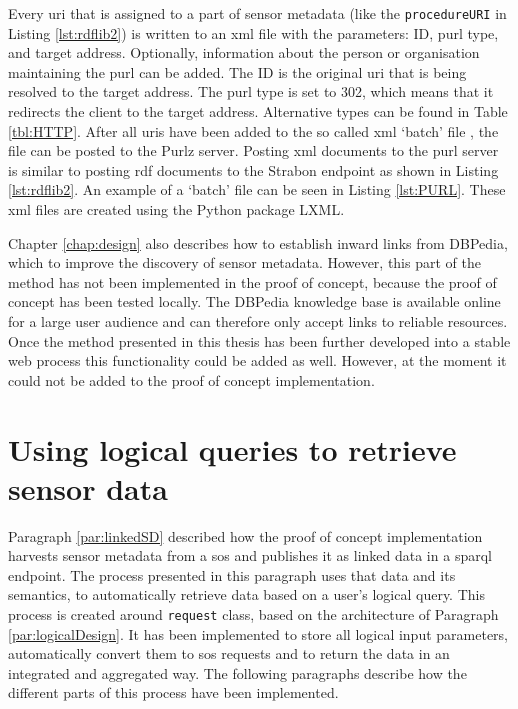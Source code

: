 Every \ac{uri} that is assigned to a part of sensor metadata (like the \texttt{procedureURI} in Listing \ref{lst:rdflib2}) is written to an \ac{xml} file with the parameters: ID, \ac{purl} type, and target address. Optionally, information about the person or organisation maintaining the \ac{purl} can be added. The ID is the original \ac{uri} that is being resolved to the target address. The \ac{purl} type is set to 302, which means that it redirects the client to the target address. Alternative types can be found in Table \ref{tbl:HTTP}. After all \acp{uri} have been added to the so called \ac{xml} `batch' file \citep{LD:PURL2}, the file can be posted to the Purlz server. Posting \ac{xml} documents to the \ac{purl} server is similar to posting \ac{rdf} documents to the Strabon endpoint as shown in Listing \ref{lst:rdflib2}. An example of a `batch' file can be seen in Listing \ref{lst:PURL}. These \ac{xml} files are created using the Python package LXML. 

Chapter \ref{chap:design} also describes how to establish inward links from DBPedia, which to improve the discovery of sensor metadata. However, this part of the method has not been implemented in the proof of concept, because the proof of concept has been tested locally. The DBPedia knowledge base is available online for a large user audience and can therefore only accept links to reliable resources. Once the method presented in this thesis has been further developed into a stable web process this functionality could be added as well. However, at the moment it could not be added to the proof of concept implementation.  

\section{Using logical queries to retrieve sensor data}
\label{par:logicalQuery}
Paragraph \ref{par:linkedSD} described how the proof of concept implementation harvests sensor metadata from a \ac{sos} and publishes it as linked data in a \ac{sparql} endpoint. The process presented in this paragraph uses that data and its semantics, to automatically retrieve data based on a user's logical query. This process is created around \texttt{request} class, based on the architecture of Paragraph \ref{par:logicalDesign}. It has been implemented to store all logical input parameters, automatically convert them to \ac{sos} requests and to return the data in an integrated and aggregated way. The following paragraphs describe how the different parts of this process have been implemented.

